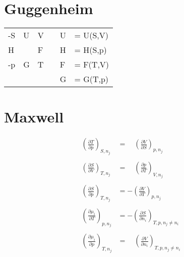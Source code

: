 \documentclass[twocolumn]{article}
\begin{document}

\section{Guggenheim}
\Large
\begin{tabular}{llllll}
	-S & U & V &	&U &= U(S,V) \\ 
	 H &   & F &   	&H &= H(S,p) \\
	-p & G & T &   	&F &= F(T,V) \\
	   &   &   &  	&G &= G(T,p) \\
\end{tabular}
\normalsize
\bigskip
\bigskip
\bigskip
\bigskip
\bigskip
\pagebreak



\section{Maxwell}

\begin{align*}
	\left(\frac{\partial T}{\partial p}\right)_{S,n_j}
	&= \quad
	\left(\frac{\partial V}{\partial S}\right)_{p,n_j}
	\\\\
	\left(\frac{\partial S}{\partial V}\right)_{T,n_j}
	&= \quad
	\left(\frac{\partial p}{\partial T}\right)_{V,n_j}
	\\\\
	\left(\frac{\partial S}{\partial p}\right)_{T,n_j}
	&= -
	\left(\frac{\partial V}{\partial T}\right)_{p,n_j}
	\\\\
	\left(\frac{\partial \mu _i}{\partial T}\right)_{p,n_j}
	&= -
	\left(\frac{\partial S}{\partial n_i}\right)_{T,p,n_j \neq n_i}
	\\\\
	\left(\frac{\partial \mu_i}{\partial p}\right)_{T,n_j}
	&=
	\quad \left(\frac{\partial V}{\partial n_i}\right)_{T,p,n_j \neq n_i}
\end{align*}
\end{document}
